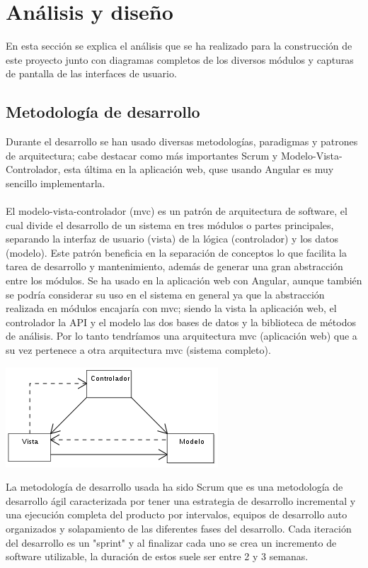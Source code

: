 \documentclass[14pt]{extarticle}
\theoremstyle{definition}
\theoremstyle{remark}
\begin{document}
\section{Análisis y diseño}\label{sec:analisisydiseno}
En esta sección se explica el análisis que se ha realizado para la construcción de este proyecto junto con diagramas completos de los diversos módulos y capturas de pantalla de las interfaces de usuario.
\subsection{Metodología de desarrollo}\label{sec:metodologiadedesarrollo}
Durante el desarrollo se han usado diversas metodologías, paradigmas y patrones de arquitectura; cabe destacar como más importantes Scrum y Modelo-Vista-Controlador, esta última en la aplicación web, quse usando Angular es muy sencillo implementarla.\\\\
El modelo-vista-controlador (mvc) \cite{wiki:modelo_vista_controlador} es un patrón de arquitectura de software, el cual divide el desarrollo de un sistema en tres módulos o partes principales, separando la interfaz de usuario (vista) de la lógica (controlador) y los datos (modelo). Este patrón beneficia en la separación de conceptos lo que facilita la tarea de desarrollo y mantenimiento, además de generar una gran abstracción entre los módulos. Se ha usado en la aplicación web con Angular, aunque también se podría considerar su uso en el sistema en general ya que la abstracción realizada en módulos encajaría con mvc; siendo la vista la aplicación web, el controlador la API y el modelo las dos bases de datos y la biblioteca de métodos de análisis. Por lo tanto tendríamos una arquitectura mvc (aplicación web) que a su vez pertenece a otra arquitectura mvc (sistema completo).
\begin{center}
\includegraphics{modelo_vista_controlador.png}
\end{center}
La metodología de desarrollo usada ha sido Scrum \cite{wiki:scrum} que es una metodología de desarrollo ágil caracterizada por tener una estrategia de desarrollo incremental y una ejecución completa del producto por intervalos, equipos de desarrollo auto organizados y solapamiento de las diferentes fases del desarrollo. Cada iteración del desarrollo es un "sprint" y al finalizar cada uno se crea un incremento de software utilizable, la duración de estos suele ser entre 2 y 3 semanas.\\\\
\end{document}

